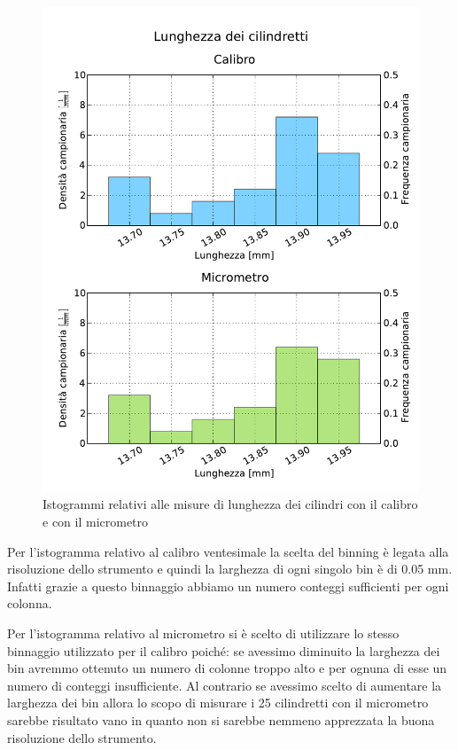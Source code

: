 \documentclass[12pt, twoside, a4paper]{article}
\begin{document}
\begin{figure}[bht]
	\centering
	\includegraphics[width=130mm]{Cilindretti_calibro_micrometro.pdf}
	\caption{Istogrammi relativi alle misure di lunghezza dei cilindri con il calibro e con il micrometro}
\end{figure}

Per l'istogramma relativo al calibro ventesimale la scelta del binning è legata alla risoluzione dello strumento e quindi la larghezza di ogni singolo bin è di 0.05 mm. Infatti grazie a questo binnaggio abbiamo un numero conteggi sufficienti per ogni colonna.

Per l'istogramma relativo al micrometro si è scelto di utilizzare lo stesso binnaggio utilizzato per il calibro poiché: se avessimo diminuito la larghezza dei bin avremmo ottenuto un numero di colonne troppo alto e per ognuna di esse un numero di conteggi insufficiente. Al contrario se avessimo scelto di aumentare la larghezza dei bin allora lo scopo di misurare i 25 cilindretti con il micrometro sarebbe risultato vano in quanto non si sarebbe nemmeno apprezzata la buona risoluzione dello strumento.
\end{document}
